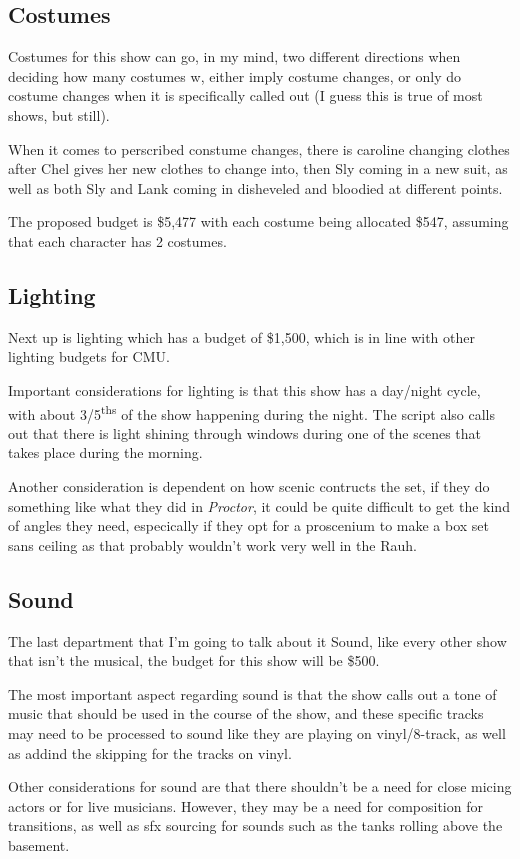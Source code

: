\documentclass[12pt]{article}
\begin{document}
\begin{doublespace}
\subsection*{Costumes}
    \par Costumes for this show can go, in my mind, two different directions when deciding how many costumes w, either imply costume changes, or only do costume changes when it is specifically called out (I guess this is true of most shows, but still).
    \par When it comes to perscribed constume changes, there is caroline changing clothes after Chel gives her new clothes to change into, then Sly coming in a new suit, as well as both Sly and Lank coming in disheveled and bloodied at different points.
    \par The proposed budget is \$5,477 with each costume being allocated \$547, assuming that each character has 2 costumes.
\subsection*{Lighting}
    \par Next up is lighting which has a budget of \$1,500, which is in line with other lighting budgets for CMU\@.
    \par Important considerations for lighting is that this show has a day/night cycle, with about 3/5\textsuperscript{ths} of the show happening during the night. The script also calls out that there is light shining through windows during one of the scenes that takes place during the morning.
    \par Another consideration is dependent on how scenic contructs the set, if they do something like what they did in \textit{Proctor}, it could be quite difficult to get the kind of angles they need, especically if they opt for a proscenium to make a box set sans ceiling as that probably wouldn't work very well in the Rauh.
\subsection*{Sound}
    \par The last department that I'm going to talk about it Sound, like every other show that isn't the musical, the budget for this show will be \$500.
    \par The most important aspect regarding sound is that the show calls out a tone of music that should be used in the course of the show, and these specific tracks may need to be processed to sound like they are playing on vinyl/8-track, as well as addind the skipping for the tracks on vinyl.
    \par Other considerations for sound are that there shouldn't be a need for close micing actors or for live musicians. However, they may be a need for composition for transitions, as well as sfx sourcing for sounds such as the tanks rolling above the basement.


\end{doublespace}
\end{document}
